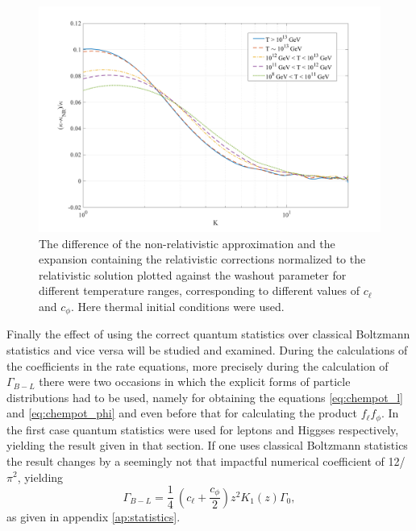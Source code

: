 \begin{figure}[H]
	\centering
	\includegraphics[width=\linewidth]{Images/corrections}
	\caption{The difference of the non-relativistic approximation and the expansion containing the relativistic corrections normalized to the relativistic solution plotted against the washout parameter for different temperature ranges, corresponding to different values of $c_\ell$ and $c_\phi$. Here thermal initial conditions were used.}
	\label{fig:corrections}
\end{figure}\noindent
Finally the effect of using the correct quantum statistics over classical Boltzmann statistics and vice versa will be studied and examined. 
During the calculations of the coefficients in the rate equations, more precisely during the calculation of $\Gamma_{B-L}$ there were two occasions in which the explicit forms of particle distributions had to be used, namely for obtaining the equations \eqref{eq:chempot_l} and \eqref{eq:chempot_phi} and even before that for calculating the product $f_\ell f_\phi$. \newline \indent
In the first case quantum statistics were used for leptons and Higgses respectively, yielding the result given in that section. If one uses classical Boltzmann statistics the result changes by a seemingly not that impactful numerical coefficient of 12/$\pi^2$, yielding
\begin{equation}
\Gamma_{B-L}=\frac{1}{4}\:\left(c_\ell+\frac{c_\phi}{2}\right)z^2K_1(z)\Gamma_0,
\label{eq:Gamma_B-l_classical}
\end{equation}
as given in appendix \ref{ap:statistics}.
